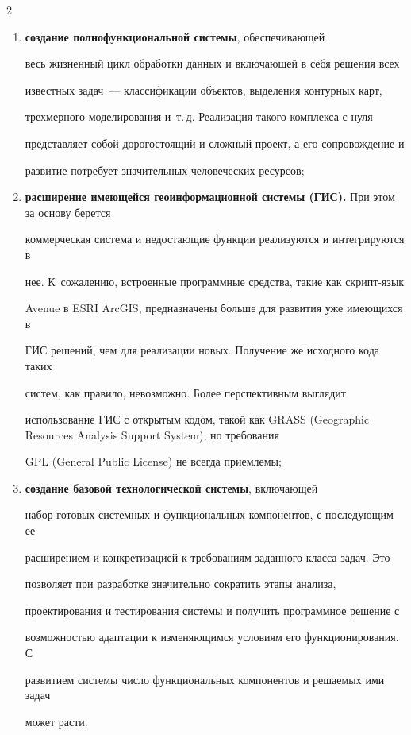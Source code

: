 \begin{multicols}{2}
\begin{enumerate}[(1)]
   \item \textbf{создание полнофункциональной системы}, обеспечивающей 

весь жизненный цикл обработки данных и включающей в себя решения всех 

известных задач~--- классификации объектов, выделения контурных карт, 

трехмерного моделирования и~т.\,д. Реализация такого комплекса с нуля 

представляет собой дорогостоящий и сложный проект, а его сопровождение и 

развитие потребует значительных человеческих ресурсов;

\item \textbf{расширение имеющейся геоинформационной сис\-те\-мы (ГИС).} При этом за основу берется 

коммерческая система и не\-дос\-та\-ющие функции реализуются и интегрируются в 

нее. К~сожалению, встроенные программные средства, такие как скрипт-язык 

Avenue в ESRI ArcGIS, предназначены больше для развития уже имеющихся в 

ГИС решений, чем для реализации новых. Получение же исходного кода таких 

систем, как правило, невозможно. Более перспективным выглядит 

использование ГИС с открытым кодом, такой как GRASS (Geographic Resources Analysis Support System), но требования 

GPL (General Public License) не всегда приемлемы;

\item \textbf{создание базовой технологической системы}, включающей 

набор готовых системных и функциональных компонентов, с по\-сле\-ду\-ющим ее 

расширением и конкретизацией к требованиям заданного класса задач. Это 

позволяет при разработке значительно сократить этапы анализа, 

проектирования и тестирования системы и получить программное решение с 

воз\-мож\-ностью адаптации к изменяющимся условиям его функционирования. С 

развитием сис\-те\-мы чис\-ло функциональных компонентов и решаемых ими задач 

может расти.

   \end{enumerate}


\end{multicols}
